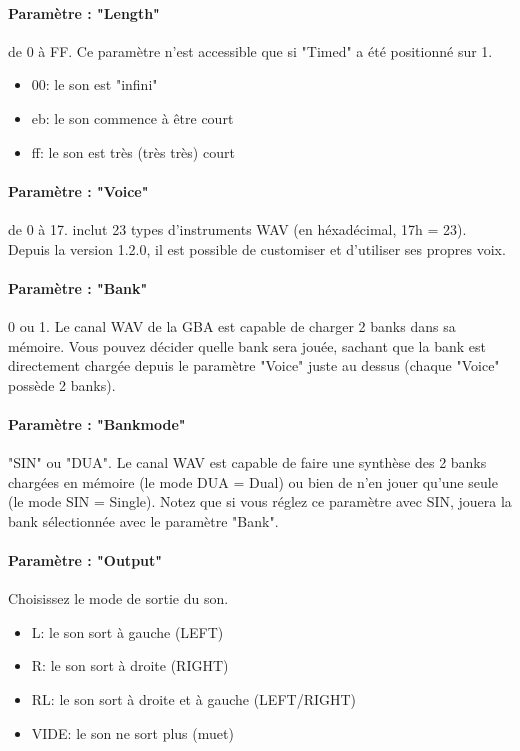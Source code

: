 \paragraph{Paramètre : "Length"} de 0 à FF.
Ce paramètre n'est accessible que si "Timed" a été positionné sur 1.
\medskip

\begin{itemize}
        \item{00: le son est "infini"}
        \item{eb: le son commence à être court}
        \item{ff: le son est très (très très) court}
    \end{itemize}

\paragraph{Paramètre : "Voice"} de 0 à 17.
\FAT inclut 23 types d'instruments WAV (en héxadécimal, 17h = 23).
Depuis la version 1.2.0, il est possible de customiser et d'utiliser ses propres voix.

\paragraph{Paramètre : "Bank"} 0 ou 1.
Le canal WAV de la GBA est capable de charger 2 banks dans sa mémoire.
Vous pouvez décider quelle bank sera jouée,
sachant que la bank est directement chargée depuis le paramètre "Voice" juste au dessus (chaque "Voice" possède 2 banks).

\paragraph{Paramètre : "Bankmode"} "SIN" ou "DUA".
Le canal WAV est capable de faire une synthèse des 2 banks chargées en mémoire (le mode DUA = Dual) ou bien de n'en jouer qu'une seule (le mode SIN = Single).
Notez que si vous réglez ce paramètre avec SIN, \FAT jouera la bank sélectionnée avec le paramètre "Bank".

\paragraph{Paramètre : "Output"} Choisissez le mode de sortie du son.
\medskip

\begin{itemize}
    \item{L: le son sort à gauche (LEFT)}
    \item{R: le son sort à droite (RIGHT)}
    \item{RL: le son sort à droite et à gauche (LEFT/RIGHT)}
    \item{VIDE: le son ne sort plus (muet)}
\end{itemize}

